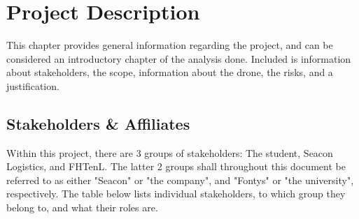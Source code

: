 \chapter{Project Description}
\label{ch:requirements_analysis}
This chapter provides general information regarding the project, and can be considered an introductory chapter of the analysis done. Included is information about stakeholders, the scope, information about the drone, the risks, and a justification. 

\section{Stakeholders \& Affiliates}
Within this project, there are 3 groups of stakeholders: The student, Seacon Logistics, and \gls{FHTenL}. The latter 2 groups shall throughout this document be referred to as either "Seacon" or "the company", and "Fontys" or "the university", respectively. The table below lists individual stakeholders, to which group they belong to, and what their roles are.

